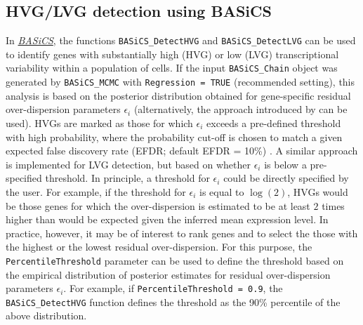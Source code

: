 \documentclass[9pt,a4paper,]{extarticle}
\begin{document}
\hypertarget{hvglvg-detection-using-basics}{%
\subsection{HVG/LVG detection using BASiCS}\label{hvglvg-detection-using-basics}}

In \emph{\href{https://bioconductor.org/packages/3.11/BASiCS}{BASiCS}}, the functions \texttt{BASiCS\_DetectHVG} and
\texttt{BASiCS\_DetectLVG} can be used to identify genes with substantially high (HVG)
or low (LVG) transcriptional variability within a population of cells.
If the input \texttt{BASiCS\_Chain} object was generated by \texttt{BASiCS\_MCMC} with
\texttt{Regression\ =\ TRUE} (recommended setting), this analysis is based on the
posterior distribution obtained for gene-specific residual over-dispersion
parameters \(\epsilon_i\) (alternatively, the approach introduced by
\citep{Vallejos2015} can be used).
HVGs are marked as those for which \(\epsilon_i\) exceeds a pre-defined threshold
with high probability, where the probability cut-off is chosen to match a given
expected false discovery rate (EFDR; default EFDR = 10\%) \citep{Newton2004}.
A similar approach is implemented for LVG detection, but based on whether
\(\epsilon_i\) is below a pre-specified threshold.
In principle, a threshold for \(\epsilon_i\) could be directly specified by the
user.
For example, if the threshold for \(\epsilon_i\) is equal to \(\log(2)\), HVGs would
be those genes for which the over-dispersion is estimated to be at least \(2\)
times higher than would be expected given the inferred mean expression level.
In practice, however, it may be of interest to rank genes and to select the
those with the highest or the lowest residual over-dispersion.
For this purpose, the \texttt{PercentileThreshold} parameter can be used to define the
threshold based on the empirical distribution of posterior estimates for
residual over-dispersion parameters \(\epsilon_i\).
For example, if \texttt{PercentileThreshold\ =\ 0.9}, the \texttt{BASiCS\_DetectHVG} function
defines the threshold as the 90\% percentile of the above distribution.
\end{document}
